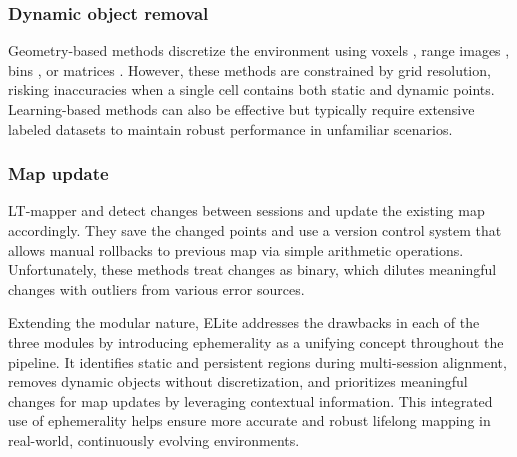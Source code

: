 \subsubsection{Dynamic object removal} 
Geometry-based methods discretize the environment using voxels \cite{hornung2013octomap, schmid2023dynablox, duberg2024dufomap}, range images \cite{kim2020remove}, bins \cite{lim2021erasor, lim2023erasor2}, or matrices \cite{jia2024beautymap}.
However, these methods are constrained by grid resolution, risking inaccuracies when a single cell contains both static and dynamic points. 
Learning-based methods \cite{pfreundschuh2021dynamic, mersch2022receding, sun2022efficient} can also be effective but typically require extensive labeled datasets to maintain robust performance in unfamiliar scenarios.

\subsubsection{Map update} 
LT-mapper \cite{kim2022lt} and \citeauthor{yang2024lifelong} \cite{yang2024lifelong} detect changes between sessions and update the existing map accordingly. 
They save the changed points and use a version control system \cite{spinellis2012git} that allows manual rollbacks \cite{holoch2022detecting} to previous map via simple arithmetic operations.
Unfortunately, these methods treat changes as binary, which dilutes meaningful changes with outliers from various error sources.

Extending the modular nature, ELite addresses the drawbacks in each of the three modules by introducing ephemerality as a unifying concept throughout the pipeline. It identifies static and persistent regions during multi-session alignment, removes dynamic objects without discretization, and prioritizes meaningful changes for map updates by leveraging contextual information. This integrated use of ephemerality helps ensure more accurate and robust lifelong mapping in real-world, continuously evolving environments.
